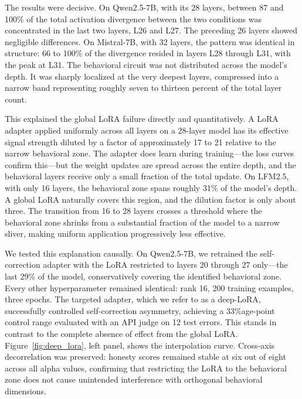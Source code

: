 \documentclass[11pt,a4paper]{article}
\begin{document}
The results were decisive. On Qwen2.5-7B, with its 28 layers, between 87 and 100\% of the total activation divergence between the two conditions was concentrated in the last two layers, L26 and L27. The preceding 26 layers showed negligible differences. On Mistral-7B, with 32 layers, the pattern was identical in structure: 66 to 100\% of the divergence resided in layers L28 through L31, with the peak at L31. The behavioral circuit was not distributed across the model's depth. It was sharply localized at the very deepest layers, compressed into a narrow band representing roughly seven to thirteen percent of the total layer count.

This explained the global LoRA failure directly and quantitatively. A LoRA adapter applied uniformly across all layers on a 28-layer model has its effective signal strength diluted by a factor of approximately 17 to 21 relative to the narrow behavioral zone. The adapter does learn during training---the loss curves confirm this---but the weight updates are spread across the entire depth, and the behavioral layers receive only a small fraction of the total update. On LFM2.5, with only 16 layers, the behavioral zone spans roughly 31\% of the model's depth. A global LoRA naturally covers this region, and the dilution factor is only about three. The transition from 16 to 28 layers crosses a threshold where the behavioral zone shrinks from a substantial fraction of the model to a narrow sliver, making uniform application progressively less effective.

We tested this explanation causally. On Qwen2.5-7B, we retrained the self-correction adapter with the LoRA restricted to layers 20 through 27 only---the last 29\% of the model, conservatively covering the identified behavioral zone. Every other hyperparameter remained identical: rank 16, 200 training examples, three epochs. The targeted adapter, which we refer to as a deep-LoRA, successfully controlled self-correction asymmetry, achieving a 33\%age-point control range evaluated with an API judge on 12 test errors. This stands in contrast to the complete absence of effect from the global LoRA. Figure~\ref{fig:deep_lora}, left panel, shows the interpolation curve. Cross-axis decorrelation was preserved: honesty scores remained stable at six out of eight across all alpha values, confirming that restricting the LoRA to the behavioral zone does not cause unintended interference with orthogonal behavioral dimensions.
\end{document}
